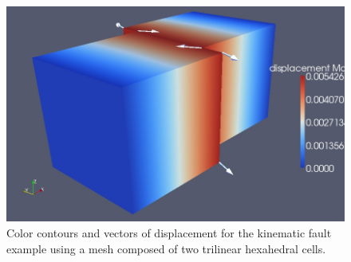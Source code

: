 \noindent \begin{center}
\begin{figure}
\noindent \begin{centering}
\includegraphics[scale=0.33]{tutorials/twocells/figs/twohex8-dislocation}
\par\end{centering}

\caption{Color contours and vectors of displacement for the kinematic fault
example using a mesh composed of two trilinear hexahedral cells.\label{fig:twohex8-disloc}}
\end{figure}

\par\end{center}
